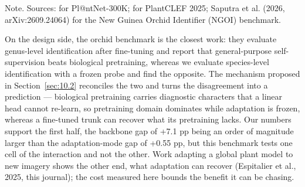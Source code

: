 \documentclass[preprint,12pt,authoryear]{elsarticle}
\begin{document}
\begin{table}[tbp]
\centering
\caption{Comparison with existing plant and fern identification benchmarks}
\label{tab:10}
\par\vspace{3pt}
\noindent\begin{minipage}{\linewidth}\footnotesize
Note. Sources: \citet{garcin2021} for Pl@ntNet-300K; \citet{martellucci2025} for PlantCLEF 2025; Saputra et al. (2026, arXiv:2609.24064) for the New Guinea Orchid Identifier (NGOI) benchmark.
\end{minipage}
\end{table}

On the design side, the orchid benchmark is the closest work: they evaluate genus-level identification after fine-tuning and report that general-purpose self-supervision beats biological pretraining, whereas we evaluate species-level identification with a frozen probe and find the opposite. The mechanism proposed in Section~\ref{sec:10.2} reconciles the two and turns the disagreement into a prediction --- biological pretraining carries diagnostic characters that a linear head cannot re-learn, so pretraining domain dominates while adaptation is frozen, whereas a fine-tuned trunk can recover what its pretraining lacks. Our numbers support the first half, the backbone gap of +7.1 pp being an order of magnitude larger than the adaptation-mode gap of +0.55 pp, but this benchmark tests one cell of the interaction and not the other. Work adapting a global plant model to new imagery shows the other end, what adaptation can recover (Espitalier et al., 2025, this journal); the cost measured here bounds the benefit it can be chasing.
\end{document}
